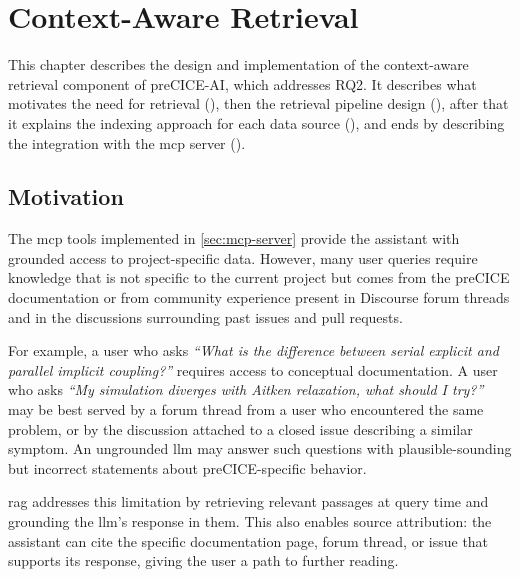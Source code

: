 \documentclass[
  numbers=noenddot,
  english,
  a4paper,
  twoside,
  bibliography=totoc,
  headsepline,
  cleardoublepage=empty,
  parskip=half,
  draft=false
]{scrbook}
\theoremstyle{break}
\renewcommand{\_}{\textunderscore\allowbreak}
\begin{document}
\FloatBarrier

\chapter{Context-Aware Retrieval}\label{sec:context-retrieval}

This chapter describes the design and implementation of the context-aware retrieval component
of preCICE-AI, which addresses RQ2. It describes what motivates the need for retrieval 
(), then the retrieval pipeline design 
(), after that it explains the indexing approach for each 
data source (), and ends by describing the integration with 
the \gls{mcp} server ().


\section{Motivation}\label{sec:context-retrieval:motivation}

The \gls{mcp} tools implemented in \cref{sec:mcp-server} provide the assistant with grounded
access to project-specific data.
However, many user queries require knowledge that is not specific to the current project but
comes from the preCICE documentation or from community experience present in Discourse forum
threads and in the discussions surrounding past issues and pull requests.

For example, a user who asks \emph{``What is the difference between serial explicit and
parallel implicit coupling?''} requires access to conceptual documentation.
A user who asks \emph{``My simulation diverges with Aitken relaxation, what should I try?''}
may be best served by a forum thread from a user who encountered the same problem, or by the
discussion attached to a closed issue describing a similar symptom.
An ungrounded \gls{llm} may answer such questions with plausible-sounding but incorrect
statements about preCICE-specific behavior.

\Gls{rag} addresses this limitation by retrieving relevant passages at query time and grounding
the \gls{llm}'s response in them.
This also enables source attribution: the assistant can cite the specific documentation page,
forum thread, or issue that supports its response, giving the user a path to further reading.
\end{document}
